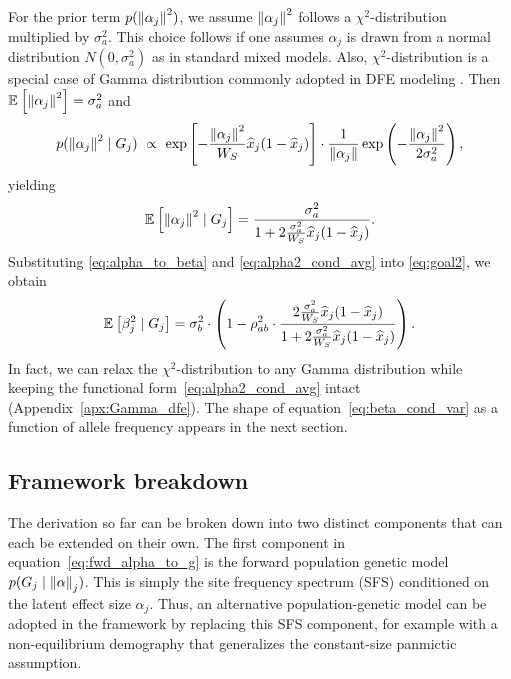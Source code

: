 \documentclass[10pt]{article}
\begin{document}
For the prior term $p(\left\| \alpha_j \right\|^2)$, we assume $\left\| \alpha_j \right\|^2$ follows a $\chi^2$-distribution multiplied by $\sigma_a^2$.
This choice follows if one assumes $\alpha_j$ is drawn from a normal distribution $N(0,\sigma_a^2)$ as in standard mixed models.
Also, $\chi^2$-distribution is a special case of Gamma distribution commonly adopted in DFE modeling \citep{EyreWalker2007}.
Then $\mathbb{E}_{}\left[\left\| \alpha_j \right\|^2\right] = \sigma_a^2$ and
\begin{equation*}
    p(\norm{\alpha_j}^2 \mid G_j) \ \propto \ \exp\left[-\frac{\norm{\alpha_j}^2}{W_S}\hx_j(1-\hx_j) \right] \cdot
    \frac{1}{\norm{\alpha_j}}\exp\left(-\frac{\norm{\alpha_j}^2}{2\sigma_a^2}\right),
\end{equation*}
yielding
\begin{equation} \label{eq:alpha2_cond_avg}
    \mathbb{E}_{}\left[\left\| \alpha_j \right\|^2 \mid G_j\right] =
    \frac{\sigma_a^2}{
    1 + 2\frac{\sigma_a^2}{W_S}\widehat{x}_j(1-\widehat{x}_j)
    }.
\end{equation}
Substituting 
\eqref{eq:alpha_to_beta} and
\eqref{eq:alpha2_cond_avg}  into \eqref{eq:goal2}, we obtain
\begin{equation} \label{eq:beta_cond_var}
    \mathbb{E}_{}\left[\beta_j^2 \mid G_j\right] = 
    \sigma_b^2 \cdot
    \left(
        1 - \rho_{ab}^2 \cdot 
        \frac{
        2 \frac{\sigma_a^2}{W_S}\widehat{x}_j(1-\widehat{x}_j) 
        }{
        1+ 2 \frac{\sigma_a^2}{W_S}\widehat{x}_j(1-\widehat{x}_j)
        }
    \right).
\end{equation}
In fact, we can relax the $\chi^2$-distribution to any Gamma distribution while keeping the functional form~\eqref{eq:alpha2_cond_avg} intact (Appendix~\ref{apx:Gamma_dfe}).
The shape of equation~\eqref{eq:beta_cond_var} as a function of allele frequency appears in the next section.


\subsection{Framework breakdown}
The derivation so far can be broken down into two distinct components that can each be extended on their own.
The first component in equation~\eqref{eq:fwd_alpha_to_g} is the forward population genetic model $p(G_j \mid \left\| \alpha \right\|_j)$.
This is simply the site frequency spectrum (SFS) conditioned on the latent effect size $\alpha_j$.
Thus, an alternative population-genetic model can be adopted in the framework by replacing this SFS component,
for example with a non-equilibrium demography that generalizes the constant-size panmictic assumption.
\end{document}
